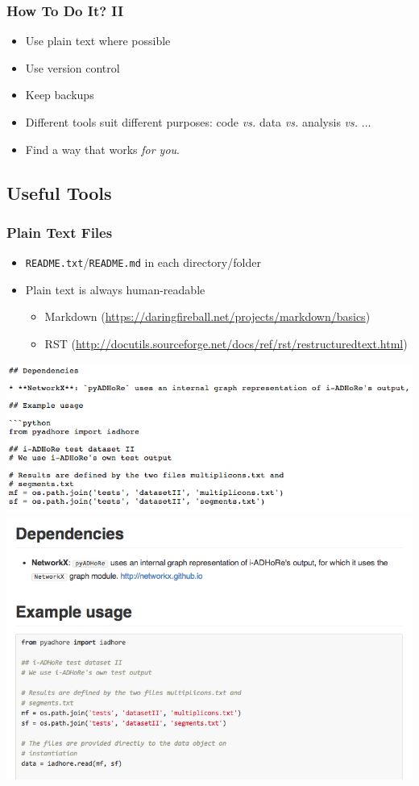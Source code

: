 \documentclass[table]{beamer}
\begin{document}
   \begin{frame}
     \frametitle{How To Do It? II}
     \begin{itemize}
	   \item Use plain text where possible
	   \item Use version control
	   \item Keep backups
	   \item Different tools suit different purposes: code \textit{vs.} data \textit{vs.} analysis \textit{vs.} $\ldots$
	   \item Find a way that works \emph{for you}.
	\end{itemize}
   \end{frame}
   
   
   \subsection{Useful Tools}
   \begin{frame}
     \frametitle{Plain Text Files}
     \begin{itemize}
       \item \texttt{README.txt}/\texttt{README.md} in each directory/folder
       \item Plain text is always human-readable
       \begin{itemize}
         \item Markdown (\url{https://daringfireball.net/projects/markdown/basics})
         \item RST (\url{http://docutils.sourceforge.net/docs/ref/rst/restructuredtext.html})
       \end{itemize}
     \end{itemize}
    \includegraphics[width=.4\textwidth]{images/markdown_before}
	\includegraphics[width=.4\textwidth]{images/markdown_after}
   \end{frame}
   
\end{document}
